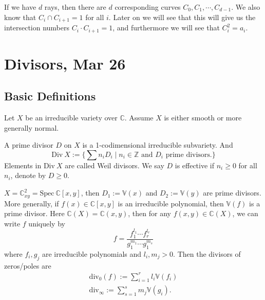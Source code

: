 \documentclass[a4paper,12pt]{amsart}
\newcommand{\ZZ}{\mathbb{Z}}
\newcommand{\CC}{\mathbb{C}}
\begin{document}
\begin{remark}
	If we have $d$ rays, then there are $d$ corresponding curves $C_0,C_1,\cdots,C_{d-1}$. We also know that $C_i\cap C_{i+1}=1$ for all $i$. Later on we will see that this will give us the intersection numbers $C_i\cdot C_{i+1}=1$, and furthermore we will see that $C_i^2=a_i$.
\end{remark}

\newpage
\section{Divisors, Mar 26}

\subsection{Basic Definitions}

Let $X$ be an irreducible variety over $\CC$. Assume $X$ is either smooth or more generally normal.

\begin{definition}
	A prime divisor $D$ on $X$ is a 1-codimensional irreducible subvariety. And
	\begin{displaymath}
	\mathrm{Div}~X:=\{\sum n_iD_i\mid n_i\in\ZZ\text{ and }D_i\text{ prime divisors.}\}
	\end{displaymath}
	Elements in $\mathrm{Div}~X$ are called Weil divisors. We say $D$ is effective if $n_i\geq0$ for all $n_i$, denote by $D\geq0$.
\end{definition}

\begin{example}
	$X=\CC_{xy}^2=\mathrm{Spec}~\CC[x,y]$, then $D_1:=\mathbb{V}(x)$ and $D_2:=\mathbb{V}(y)$ are prime divisors. More generally, if $f(x)\in\CC[x,y]$ is an irreducible polynomial, then $\mathbb{V}(f)$ is a prime divisor. Here $\CC(X)=\CC(x,y)$, then for any $f(x,y)\in\CC(X)$, we can write $f$ uniquely by
	\begin{displaymath}
	f=\frac{f_1^{l_1}\cdots f_r^{l_r}}{g_1^{m_1}\cdots g_1^{m_s}}
	\end{displaymath}
	where $f_i,g_j$ are irreducible polynomials and $l_i,m_j>0$. Then the divisors of zeros/poles are
	\begin{align*}
	\mathrm{div}_0(f):=\sum_{i=1}^{r}l_i\mathbb{V}(f_i)\\
	\mathrm{div}_\infty:=\sum_{s=1}^{s}m_j\mathbb{V}(g_i).
	\end{align*}
\end{example}
\end{document}
